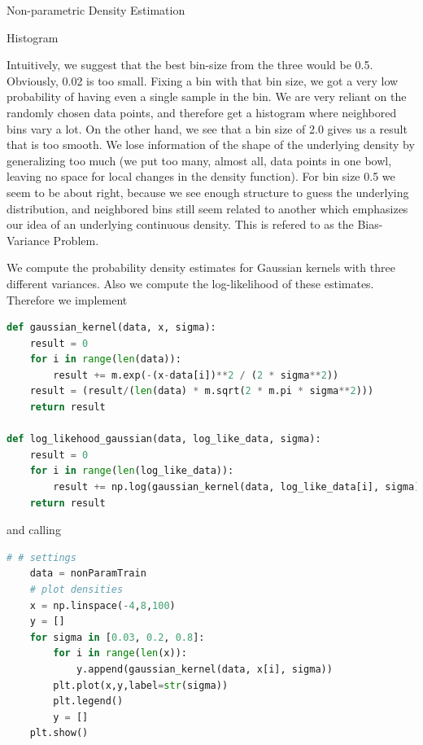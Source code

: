 \documentclass[
ngerman,
]{tudaexercise}
\begin{document}
\begin{task}{Non-parametric Density Estimation}
\begin{subtask}{Histogram}
\begin{figure}[H]
\end{figure}
Intuitively, we suggest that the best bin-size from the three would be 0.5. Obviously, 0.02 is too small. Fixing a bin with that bin size, we got a very low probability of having even a single sample in the bin. We are very reliant on the randomly chosen data points, and therefore get a histogram where neighbored bins vary a lot. On the other hand, we see that a bin size of 2.0 gives us a result that is too smooth. We lose information of the shape of the underlying density by generalizing too much (we put too many, almost all, data points in one bowl, leaving no space for local changes in the density function). For bin size 0.5 we seem to be about right, because we see enough structure to guess the underlying distribution, and neighbored bins still seem related to another which emphasizes our idea of an underlying continuous density. This is refered to as the Bias-Variance Problem.
	\end{subtask}
\begin{subtask}
	We compute the probability density estimates for Gaussian kernels with three different variances. Also we compute the log-likelihood of these estimates. Therefore we implement \begin{lstlisting}[language=Python]
def gaussian_kernel(data, x, sigma):
	result = 0
	for i in range(len(data)):
		result += m.exp(-(x-data[i])**2 / (2 * sigma**2))
	result = (result/(len(data) * m.sqrt(2 * m.pi * sigma**2)))
	return result

def log_likehood_gaussian(data, log_like_data, sigma):
	result = 0
	for i in range(len(log_like_data)):
		result += np.log(gaussian_kernel(data, log_like_data[i], sigma))
	return result
	\end{lstlisting}
	and calling
	\begin{lstlisting}[language=Python]
	# # settings
	data = nonParamTrain
	# plot densities
	x = np.linspace(-4,8,100)
	y = []
	for sigma in [0.03, 0.2, 0.8]:
		for i in range(len(x)):
			y.append(gaussian_kernel(data, x[i], sigma))
		plt.plot(x,y,label=str(sigma))
		plt.legend()
		y = []
	plt.show()
	

\end{lstlisting}
\end{subtask}
\end{task}
\end{document}
